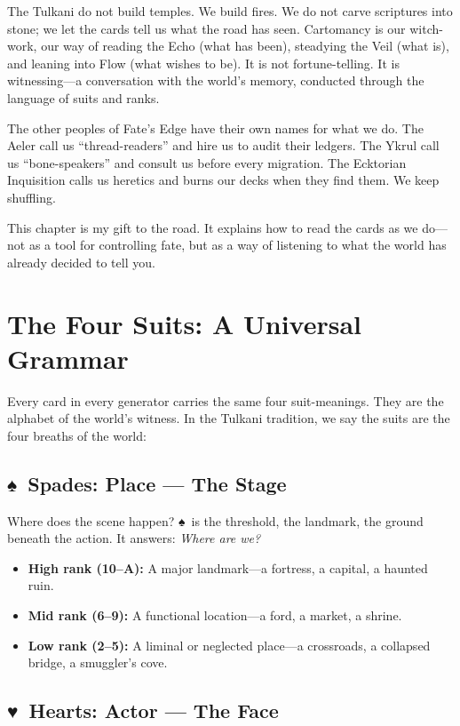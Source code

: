 \documentclass[12pt,oneside]{book}
\renewcommand{\spadesuit}{♠}
\renewcommand{\heartsuit}{♥}
\begin{document}
The Tulkani do not build temples. We build fires. We do not carve scriptures into stone; we let the cards tell us what the road has seen. Cartomancy is our witch-work, our way of reading the Echo (what has been), steadying the Veil (what is), and leaning into Flow (what wishes to be). It is not fortune-telling. It is witnessing---a conversation with the world's memory, conducted through the language of suits and ranks.

The other peoples of Fate's Edge have their own names for what we do. The Aeler call us ``thread-readers'' and hire us to audit their ledgers. The Ykrul call us ``bone-speakers'' and consult us before every migration. The Ecktorian Inquisition calls us heretics and burns our decks when they find them. We keep shuffling.

This chapter is my gift to the road. It explains how to read the cards as we do---not as a tool for controlling fate, but as a way of listening to what the world has already decided to tell you.

\section*{The Four Suits: A Universal Grammar}

Every card in every generator carries the same four suit-meanings. They are the alphabet of the world's witness. In the Tulkani tradition, we say the suits are the four breaths of the world:

\subsection*{\spadesuit\ Spades: Place --- The Stage}

Where does the scene happen? \spadesuit\ is the threshold, the landmark, the ground beneath the action. It answers: \textit{Where are we?}

\begin{itemize}
    \item \textbf{High rank (10--A):} A major landmark---a fortress, a capital, a haunted ruin.
    \item \textbf{Mid rank (6--9):} A functional location---a ford, a market, a shrine.
    \item \textbf{Low rank (2--5):} A liminal or neglected place---a crossroads, a collapsed bridge, a smuggler's cove.
\end{itemize}

\subsection*{\heartsuit\ Hearts: Actor --- The Face}
\end{document}
